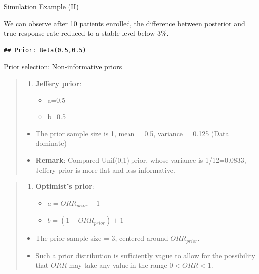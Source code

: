 \begin{frame}[fragile]{Simulation Example (II)}

We can observe after 10 patients enrolled, the difference between
posterior and true response rate reduced to a stable level below 3\%.

\begin{verbatim}
## Prior: Beta(0.5,0.5)
\end{verbatim}


\end{frame}

\begin{frame}{Prior selection: Non-informative priors}

\begin{quote}
\begin{enumerate}
\def\labelenumi{\arabic{enumi}.}
\tightlist
\item
  \textbf{Jeffery prior}:

  \begin{itemize}
  \tightlist
  \item
    a=0.5
  \item
    b=0.5
  \end{itemize}
\end{enumerate}

\begin{itemize}
\tightlist
\item
  The prior sample size is 1, mean = 0.5, variance = 0.125 (Data
  dominate)
\item
  \textbf{Remark}: Compared Unif(0,1) prior, whose variance is
  1/12=0.0833, Jeffery prior is more flat and less informative.
\end{itemize}
\end{quote}

\begin{quote}
\begin{enumerate}
\def\labelenumi{\arabic{enumi}.}
\setcounter{enumi}{1}
\tightlist
\item
  \textbf{Optimist's prior}:

  \begin{itemize}
  \tightlist
  \item
    \(a=ORR_{prior}+1\)
  \item
    \(b=(1-ORR_{prior})+1\)
  \end{itemize}
\end{enumerate}

\begin{itemize}
\tightlist
\item
  The prior sample size = 3, centered around \(ORR_{prior}\).
\item
  Such a prior distribution is sufficiently vague to allow for the
  possibility that \(ORR\) may take any value in the range \(0<ORR<1\).
\end{itemize}
\end{quote}

\end{frame}

